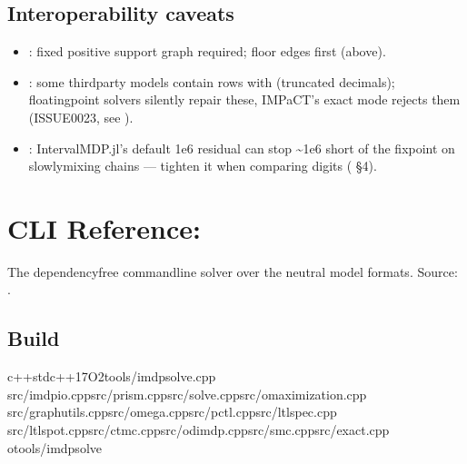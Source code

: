 \documentclass[a4paper,10pt,english]{sphinxmanual}
\begin{document}
\subsection{Interoperability caveats}
\label{\detokenize{manual/formats:interoperability-caveats}}\begin{itemize}
\item {} 
\sphinxAtStartPar
{}: fixed positive support graph required; floor \sphinxcode{\sphinxupquote{{[}0,hi{]}}}
edges first (above).

\item {} 
\sphinxAtStartPar
{}: some third\sphinxhyphen{}party models contain rows with 
(truncated decimals); floating\sphinxhyphen{}point solvers silently repair these, IMPaCT’s exact
mode rejects them (ISSUE\sphinxhyphen{}0023, see {\hyperref[\detokenize{manual/exact::doc}]{}}).

\item {} 
\sphinxAtStartPar
{}: IntervalMDP.jl’s default 1e\sphinxhyphen{}6 residual can stop \textasciitilde{}1e\sphinxhyphen{}6 short of the
fixpoint on slowly\sphinxhyphen{}mixing chains — tighten it when comparing digits
( \S{}4).

\end{itemize}

\sphinxstepscope


\section{CLI Reference: }
\label{\detokenize{manual/cli:cli-reference-imdp-solve}}\label{\detokenize{manual/cli::doc}}
\sphinxAtStartPar
The dependency\sphinxhyphen{}free command\sphinxhyphen{}line solver over the neutral model formats. Source:
.


\subsection{Build}
\label{\detokenize{manual/cli:build}}
\begin{sphinxVerbatim}[commandchars=\\\{\}]
c++\PYGZhy{}stdc++17\PYGZhy{}O2tools/imdp\PYGZus{}solve.cpp
src/imdp\PYGZus{}io.cppsrc/prism.cppsrc/solve.cppsrc/omaximization.cpp
src/graph\PYGZus{}utils.cppsrc/omega.cppsrc/pctl.cppsrc/ltlspec.cpp
src/ltl\PYGZus{}spot.cppsrc/ctmc.cppsrc/odimdp.cppsrc/smc.cppsrc/exact.cpp
\PYGZhy{}otools/imdp\PYGZus{}solve
\end{sphinxVerbatim}
\end{document}
